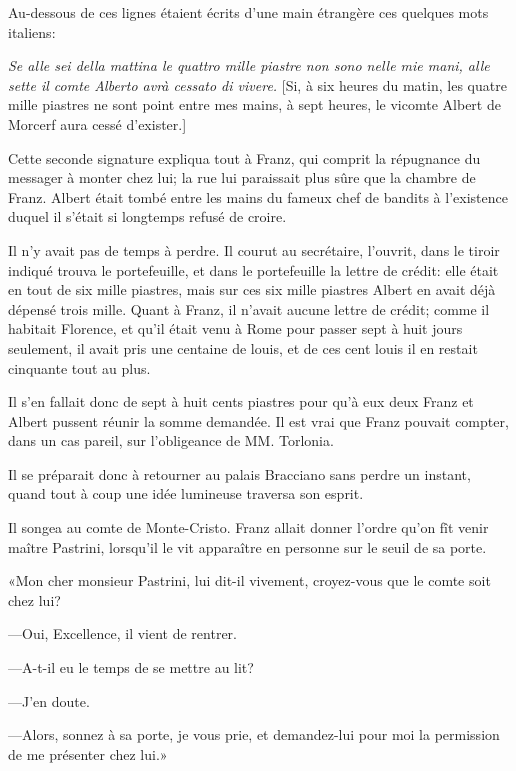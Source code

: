 Au-dessous de ces lignes étaient écrits d'une main étrangère ces quelques mots italiens: 

\begin{mail}{}{}
\textit{Se alle sei della mattina le quattro mille piastre non sono nelle mie mani, alle sette il comte Alberto avrà cessato di vivere.} [Si, à six heures du matin, les quatre mille piastres ne sont point entre mes mains, à sept heures, le vicomte Albert de Morcerf aura cessé d'exister.] 
\end{mail}

Cette seconde signature expliqua tout à Franz, qui comprit la répugnance du messager à monter chez lui; la rue lui paraissait plus sûre que la chambre de Franz. Albert était tombé entre les mains du fameux chef de bandits à l'existence duquel il s'était si longtemps refusé de croire. 

Il n'y avait pas de temps à perdre. Il courut au secrétaire, l'ouvrit, dans le tiroir indiqué trouva le portefeuille, et dans le portefeuille la lettre de crédit: elle était en tout de six mille piastres, mais sur ces six mille piastres Albert en avait déjà dépensé trois mille. Quant à Franz, il n'avait aucune lettre de crédit; comme il habitait Florence, et qu'il était venu à Rome pour passer sept à huit jours seulement, il avait pris une centaine de louis, et de ces cent louis il en restait cinquante tout au plus.  

Il s'en fallait donc de sept à huit cents piastres pour qu'à eux deux Franz et Albert pussent réunir la somme demandée. Il est vrai que Franz pouvait compter, dans un cas pareil, sur l'obligeance de MM. Torlonia. 

Il se préparait donc à retourner au palais Bracciano sans perdre un instant, quand tout à coup une idée lumineuse traversa son esprit. 

Il songea au comte de Monte-Cristo. Franz allait donner l'ordre qu'on fît venir maître Pastrini, lorsqu'il le vit apparaître en personne sur le seuil de sa porte. 

«Mon cher monsieur Pastrini, lui dit-il vivement, croyez-vous que le comte soit chez lui? 

—Oui, Excellence, il vient de rentrer. 

—A-t-il eu le temps de se mettre au lit? 

—J'en doute. 

—Alors, sonnez à sa porte, je vous prie, et demandez-lui pour moi la permission de me présenter chez lui.» 

